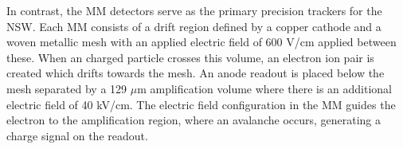 In contrast, the MM detectors serve as the primary precision trackers for the NSW\@. Each MM consists of a drift region defined by a copper cathode and a woven metallic mesh with an applied electric field of 600 V/cm applied between these. When an charged particle crosses this volume, an electron ion pair is created which drifts towards the mesh. An anode readout is placed below the mesh separated by a 129 $\mu$m amplification volume where there is an additional electric field of 40 kV/cm. The electric field configuration in the MM guides the electron to the amplification region, where an avalanche occurs, generating a charge signal on the readout.
